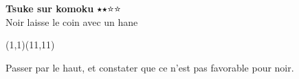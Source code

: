 \documentclass[preview, border=0pt, varwidth=false]{standalone}
\begin{document}
	\setgounit{0.6cm} 
	
\parbox[c][14.65cm][c]{10.2cm}{
	\centering
	
	{\Large\textbf{Tsuke sur komoku} 	$\medblackstar \medblackstar \medwhitestar \medwhitestar$ \\ Noir laisse le coin avec un hane}
	\vspace{3em}
	
	\begin{psgopartialboard}{(1,1)(11,11)}
		\pass
	\end{psgopartialboard}
	
	\vspace{1em}
	Passer par le haut, et constater que ce n'est pas favorable pour noir.}
\end{document}
